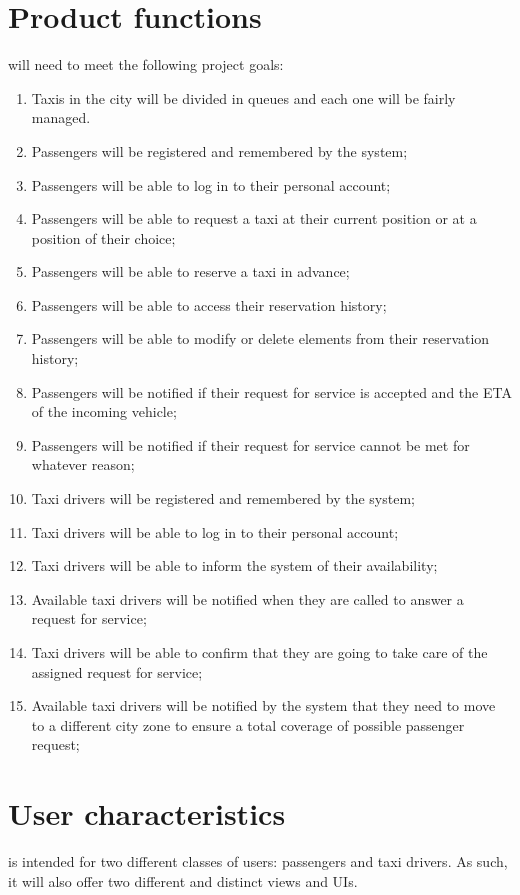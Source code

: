\section{Product functions}
\label{sec:goals}
\mts{} will need to meet the following project goals:
\begin{enumerate}

\item Taxis in the city will be divided in queues and each one will be fairly managed.
\item Passengers will be registered and remembered by the system;
\item Passengers will be able to log in to their personal account;
\item Passengers will be able to request a taxi at their current position or at a position of their choice;
\item Passengers will be able to reserve a taxi in advance;
\item Passengers will be able to access their reservation history;
\item Passengers will be able to modify or delete elements from their reservation history;
\item Passengers will be notified if their request for service is accepted and the ETA of the incoming vehicle;
\item Passengers will be notified if their request for service cannot be met for whatever reason;
\item Taxi drivers will be registered and remembered by the system;
\item Taxi drivers will be able to log in to their personal account;
\item Taxi drivers will be able to inform the system of their availability;
\item Available taxi drivers will be notified when they are called to answer a request for service;
\item Taxi drivers will be able to confirm that they are going to take care of the assigned request for service;
\item Available taxi drivers will be notified by the system that they need to move to a different city zone to ensure a total coverage of possible passenger request;

\end{enumerate}

\section{User characteristics}
\mts{} is intended for two different classes of users: passengers and taxi drivers. As such, it will also offer two different and distinct views and UIs.

